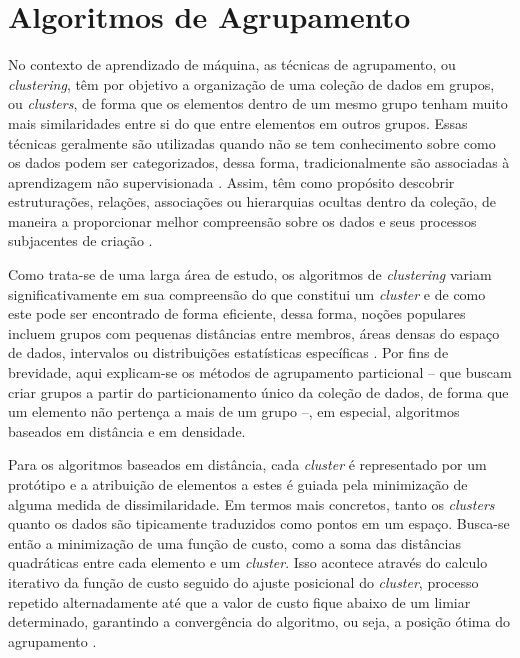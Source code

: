 \section{Algoritmos de Agrupamento}

No contexto de aprendizado de máquina, as técnicas de agrupamento, ou \textit{clustering}, têm por objetivo a organização de uma coleção de dados em grupos, ou \textit{clusters}, de forma que os elementos dentro de um mesmo grupo tenham muito mais similaridades entre si do que entre elementos em outros grupos. Essas técnicas geralmente são utilizadas quando não se tem conhecimento sobre como os dados podem ser categorizados, dessa forma, tradicionalmente são associadas à aprendizagem não supervisionada \cite{cluster1}. Assim, têm como propósito descobrir estruturações, relações, associações ou hierarquias ocultas dentro da coleção, de maneira a proporcionar melhor compreensão sobre os dados e seus processos subjacentes de criação \cite{cluster2}.

Como trata-se de uma larga área de estudo, os algoritmos de \textit{clustering} variam significativamente em sua compreensão do que constitui um \textit{cluster} e de como este pode ser encontrado de forma eficiente, dessa forma, noções populares incluem grupos com pequenas distâncias entre membros, áreas densas do espaço de dados, intervalos ou distribuições estatísticas específicas \cite{cluster2}. Por fins de brevidade, aqui explicam-se os métodos de agrupamento particional -- que buscam criar grupos a partir do particionamento único da coleção de dados, de forma que um elemento não pertença a mais de um grupo \cite{cluster1} --, em especial, algoritmos baseados em distância e em densidade.

Para os algoritmos baseados em distância, cada \textit{cluster} é representado por um protótipo e a atribuição de elementos a estes é guiada pela minimização de alguma medida de dissimilaridade. Em termos mais concretos, tanto os \textit{clusters} quanto os dados são tipicamente traduzidos como pontos em um espaço. Busca-se então a minimização de uma função de custo, como a soma das distâncias quadráticas entre cada elemento e um \textit{cluster}. Isso acontece através do calculo iterativo da função de custo seguido do ajuste posicional do \textit{cluster}, processo repetido alternadamente até que a valor de custo fique abaixo de um limiar determinado, garantindo a convergência do algoritmo, ou seja, a posição ótima do agrupamento \cite{cluster1, cluster2}.

